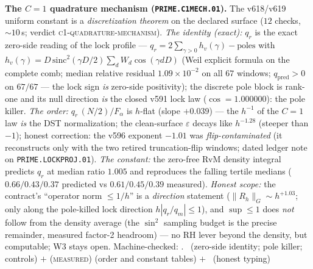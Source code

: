 \par\smallskip\noindent\textbf{The $C=1$ quadrature mechanism
(\texttt{PRIME.C1MECH.01}).}
The v618/v619 uniform constant is a \emph{discretization theorem} on
the declared surface ($12$ checks, ${\sim}10$\,s; verdict
\textsc{c1-quadrature-mechanism}).  \emph{The identity (exact):}
$q_r$ is the exact zero-side reading of the lock profile ---
$q_r=2\sum_{\gamma>0}h_v(\gamma)-\text{poles}$ with
$h_v(\gamma)=D\,\mathrm{sinc}^2(\gamma D/2)\sum_d W_d\cos(\gamma dD)$
(Weil explicit formula on the complete comb; median relative
residual $1.09\times10^{-2}$ on all $67$ windows; $q_{\mathrm{pred}}
>0$ on $67/67$ --- the lock sign \emph{is} zero-side positivity);
the discrete pole block is rank-one and its null direction \emph{is}
the closed v591 lock law ($\cos=1.000000$): the pole killer.
\emph{The order:} $q_r\,(N/2)/F_\alpha$ is $h$-flat (slope $+0.039$)
--- the $h^{-1}$ of the $C=1$ law \emph{is} the DST normalization;
the clean-surface $\varepsilon$ decays like $h^{-1.28}$ (steeper
than $-1$); honest correction: the v596 exponent $-1.01$ was
\emph{flip-contaminated} (it reconstructs only with the two retired
truncation-flip windows; dated ledger note on
\texttt{PRIME.LOCKPROJ.01}).  \emph{The constant:} the zero-free RvM
density integral predicts $q_r$ at median ratio $1.005$ and
reproduces the falling tertile medians ($0.66/0.43/0.37$ predicted
vs $0.61/0.45/0.39$ measured).  \emph{Honest scope:} the contract's
``operator norm $\le1/h$'' is a \emph{direction} statement
($\|R_h\|_G\sim h^{+1.03}$; only along the pole-killed lock
direction $h|q_r/q_m|\le1$), and $\sup\le1$ does \emph{not} follow
from the density average (the $\sin^2$ sampling budget is the
precise remainder, measured factor-2 headroom) --- no RH lever
beyond the density, but computable; W3 stays open.
Machine-checked: .
\mE\ (zero-side identity; pole killer; controls) $+$
(\textsc{measured}) (order and constant tables) $+$ \mC\ (honest
typing)
\par\smallskip


